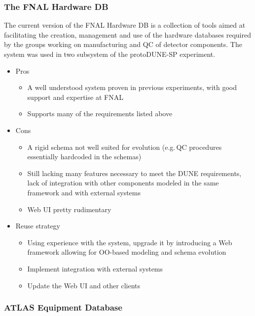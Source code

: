 \documentclass[pdftex,12pt,letter]{article}
\begin{document}
\subsubsection{The FNAL Hardware DB}

The current version of the FNAL Hardware DB \cite{hardwareDB} is a collection of tools aimed at facilitating the creation,
management and use of the hardware databases required by the groups working on manufacturing and QC of detector
components. The system was used in two subsystem of the protoDUNE-SP experiment.

\begin{itemize}

\item Pros
\begin{itemize}
\item A well understood system proven in previous experiments, with good support and expertise at FNAL
\item Supports many of the requirements listed above
\end{itemize}

\item Cons
\begin{itemize}
\item A rigid schema not well suited for evolution (e.g.\,QC procedures essentially hardcoded in the schemas)
\item Still lacking many features necessary to meet the DUNE requirements, lack of integration with other components
modeled in the same framework and with external systems
\item Web UI pretty rudimentary
\end{itemize}

\item Reuse strategy
\begin{itemize}
\item Using experience with the system, upgrade it by introducing a Web framework allowing for OO-based modeling and schema evolution
\item Implement integration with external systems
\item Update the Web UI and other clients
\end{itemize}


\end{itemize}

\subsubsection{ATLAS Equipment Database}
\end{document}
